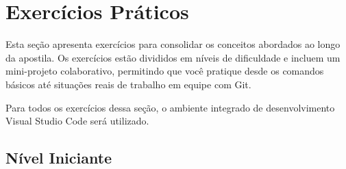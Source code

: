 \newpage
\section{Exercícios Práticos}

Esta seção apresenta exercícios para consolidar os conceitos abordados ao longo da apostila. Os exercícios estão divididos em níveis de dificuldade e incluem um mini-projeto colaborativo, permitindo que você pratique desde os comandos básicos até situações reais de trabalho em equipe com Git.

Para todos os exercícios dessa seção, o ambiente integrado de desenvolvimento Visual Studio Code será utilizado.

\subsection{Nível Iniciante}

